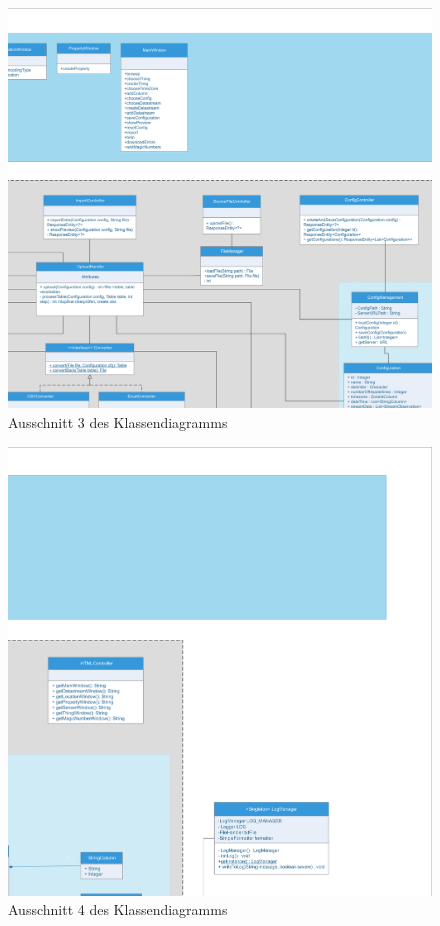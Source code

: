 \begin{figure}[!h]
\centering
\includegraphics[scale=0.4]{uml/screenshots/frithjof/slice_0_2}
\caption{Ausschnitt 3 des Klassendiagramms}
\end{figure}
\clearpage

\begin{figure}[!h]
\centering
\includegraphics[scale=0.4]{uml/screenshots/frithjof/slice_0_3}
\caption{Ausschnitt 4 des Klassendiagramms}
\end{figure}
\clearpage

